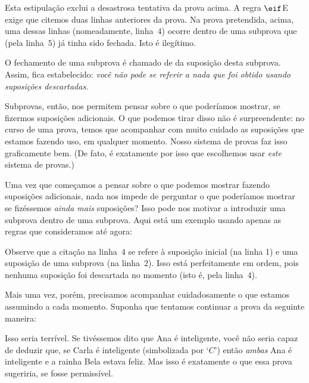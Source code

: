 Esta estipulação exclui a desastrosa tentativa da prova acima. A regra $\eif$E exige que citemos duas linhas anteriores da prova. Na prova pretendida, acima, uma dessas linhas (nomeadamente, linha~$4$)  ocorre dentro de uma subprova que (pela linha~$5$) já tinha sido fechada. Isto é ilegítimo. 

O fechamento de uma subprova é chamado de  da suposição desta subprova. Assim, fica estabelecido: \emph{você não pode se referir a nada que foi obtido usando suposições descartadas}. 

Subprovas, então, nos permitem pensar sobre o que poderíamos mostrar,  se fizermos suposições adicionais.  O que podemos  tirar disso não é surpreendente: no curso de uma prova, temos que acompanhar com muito cuidado as suposições que estamos fazendo uso, em qualquer momento.  Nosso sistema de provas faz isso graficamente bem. (De fato, é exatamente por isso que escolhemos usar  \emph{este}  sistema de provas.)

Uma vez que começamos a pensar sobre o que podemos mostrar fazendo suposições adicionais, nada nos impede de perguntar  o que poderíamos mostrar se fizéssemos  \emph{ainda mais}  suposições?  Isso pode nos motivar a introduzir uma subprova dentro de uma subprova.  Aqui está um exemplo usando apenas as regras que consideramos até agora:


\begin{fitchproof}
\open
	\open
	\close
\close
{}
\end{fitchproof}
 Observe que a citação na linha~$4$ se refere à suposição inicial (na linha 1) e uma suposição de uma subprova (na linha~$2$). Isso está perfeitamente em ordem, pois nenhuma suposição foi descartada no momento (isto é, pela linha~$4$).  

Mais uma vez, porém, precisamos acompanhar cuidadosamente o que estamos assumindo a cada momento. Suponha que tentamos continuar a prova da seguinte maneira:
\begin{fitchproof}
\open
	\open
	\close
\close
{}
 
\end{fitchproof}
 Isso seria terrível. Se tivéssemos dito  que Ana é inteligente, você não seria capaz de deduzir que, se Carla é inteligente (simbolizada por  `$C$') então \emph{ambas} Ana é inteligente  e a rainha Bela estava feliz. Mas isso é exatamente o que essa prova sugeriria, se fosse permissível.

